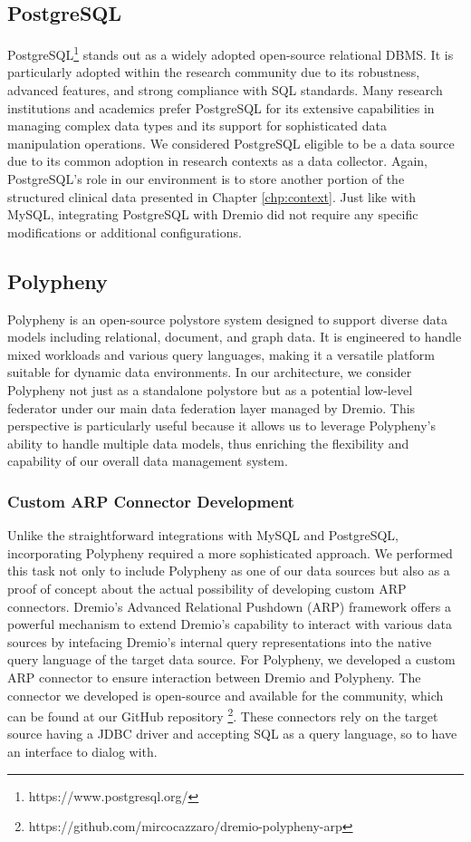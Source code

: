 \subsection{PostgreSQL}
PostgreSQL\footnote{https://www.postgresql.org/} stands out as a widely adopted open-source relational \ac{DBMS}. It is particularly adopted within the research community due to its robustness, advanced features, and strong compliance with \ac{SQL} standards. Many research institutions and academics prefer PostgreSQL for its extensive capabilities in managing complex data types and its support for sophisticated data manipulation operations. We considered PostgreSQL eligible to be a data source due to its common adoption in research contexts as a data collector.
Again, PostgreSQL's role in our environment is to store another portion of the structured clinical data presented in Chapter \ref{chp:context}.
Just like with MySQL, integrating PostgreSQL with Dremio did not require any specific modifications or additional configurations.

\subsection{Polypheny}
Polypheny \cite{DBLP:conf/bigdataconf/VogtSS18} is an open-source polystore system designed to support diverse data models including relational, document, and graph data. It is engineered to handle mixed workloads and various query languages, making it a versatile platform suitable for dynamic data environments.
In our architecture, we consider Polypheny not just as a standalone polystore but as a potential low-level federator under our main data federation layer managed by Dremio. This perspective is particularly useful because it allows us to leverage Polypheny's ability to handle multiple data models, thus enriching the flexibility and capability of our overall data management system.

\subsubsection{Custom \ac{ARP} Connector Development}
Unlike the straightforward integrations with MySQL and PostgreSQL, incorporating Polypheny required a more sophisticated approach. We performed this task not only to include Polypheny as one of our data sources but also as a proof of concept about the actual possibility of developing custom \ac{ARP} connectors.
Dremio's Advanced Relational Pushdown (ARP) framework offers a powerful mechanism to extend Dremio's capability to interact with various data sources by intefacing Dremio's internal query representations into the native query language of the target data source.
For Polypheny, we developed a custom \ac{ARP} connector to ensure interaction between Dremio and Polypheny. The connector we developed is open-source and available for the community, which can be found at our GitHub repository \footnote{https://github.com/mircocazzaro/dremio-polypheny-arp}.
These connectors rely on the target source having a \ac{JDBC} driver and accepting \ac{SQL} as a query language, so to have an interface to dialog with.

